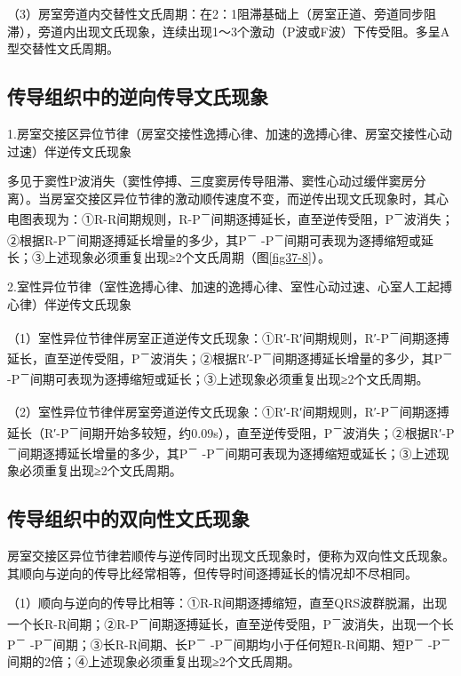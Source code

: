 （3）房室旁道内交替性文氏周期：在2：1阻滞基础上（房室正道、旁道同步阻滞），旁道内出现文氏现象，连续出现1～3个激动（P波或F波）下传受阻。多呈A型交替性文氏周期。

\protect\hypertarget{text00025.htmlux5cux23subid309}{}{}

\subsection{传导组织中的逆向传导文氏现象}

1.房室交接区异位节律（房室交接性逸搏心律、加速的逸搏心律、房室交接性心动过速）伴逆传文氏现象

多见于窦性P波消失（窦性停搏、三度窦房传导阻滞、窦性心动过缓伴窦房分离）。当房室交接区异位节律的激动顺传速度不变，而逆传出现文氏现象时，其心电图表现为：①R-R间期规则，R-P\textsuperscript{－}间期逐搏延长，直至逆传受阻，P\textsuperscript{－}波消失；②根据R-P\textsuperscript{－}间期逐搏延长增量的多少，其P\textsuperscript{－} -P\textsuperscript{－}间期可表现为逐搏缩短或延长；③上述现象必须重复出现≥2个文氏周期（图\ref{fig37-8}）。

2.室性异位节律（室性逸搏心律、加速的逸搏心律、室性心动过速、心室人工起搏心律）伴逆传文氏现象

（1）室性异位节律伴房室正道逆传文氏现象：①R′-R′间期规则，R′-P\textsuperscript{－}间期逐搏延长，直至逆传受阻，P\textsuperscript{－}波消失；②根据R′-P\textsuperscript{－}间期逐搏延长增量的多少，其P\textsuperscript{－} -P\textsuperscript{－}间期可表现为逐搏缩短或延长；③上述现象必须重复出现≥2个文氏周期。

（2）室性异位节律伴房室旁道逆传文氏现象：①R′-R′间期规则，R′-P\textsuperscript{－}间期逐搏延长（R′-P\textsuperscript{－}间期开始多较短，约0.09s），直至逆传受阻，P\textsuperscript{－}波消失；②根据R′-P\textsuperscript{－}间期逐搏延长增量的多少，其P\textsuperscript{－} -P\textsuperscript{－}间期可表现为逐搏缩短或延长；③上述现象必须重复出现≥2个文氏周期。

\protect\hypertarget{text00025.htmlux5cux23subid310}{}{}

\subsection{传导组织中的双向性文氏现象}

房室交接区异位节律若顺传与逆传同时出现文氏现象时，便称为双向性文氏现象。其顺向与逆向的传导比经常相等，但传导时间逐搏延长的情况却不尽相同。

（1）顺向与逆向的传导比相等：①R-R间期逐搏缩短，直至QRS波群脱漏，出现一个长R-R间期；②R-P\textsuperscript{－}间期逐搏延长，直至逆传受阻，P\textsuperscript{－}波消失，出现一个长P\textsuperscript{－} -P\textsuperscript{－}间期；③长R-R间期、长P\textsuperscript{－} -P\textsuperscript{－}间期均小于任何短R-R间期、短P\textsuperscript{－} -P\textsuperscript{－}间期的2倍；④上述现象必须重复出现≥2个文氏周期。


